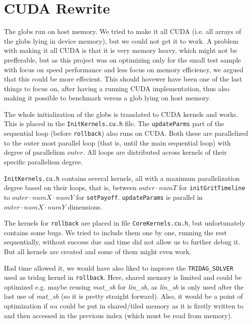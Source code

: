 \section{CUDA Rewrite}
The globs run on host memory. We tried to make it all CUDA (i.e. all arrays of the globs lying in device memory), but we could not get it to work. A problem with making it all CUDA is that it is very memory heavy, which might not be prefferable, but as this project was on optimizing only for the small test sample with focus on speed performance and less focus on memory efficiency, we argued that this could be more effecient. This should hovewer have been one of the last things to focus on, after having a running CUDA implementation, thus also making it possible to benchmark versus a glob lying on host memory.

The whole initialization of the globs is translated to CUDA kernels and works. This is placed in the \texttt{InitKernels.cu.h} file. The \texttt{updateParms} part of the sequential loop (before \texttt{rollback}) also runs on CUDA. Both these are parallelized to the outer most parallel loop (that is, until the main sequential loop) with degree of parallelism $outer$.  All loops are distributed across kernels of their specific parallelism degree.

\texttt{InitKernels.cu.h} contains several kernels, all with a maximum parallelization degree based on their loops, that is, between $outer\cdot numT$ for \texttt{initGritTimeline} to $outer\cdot numX \cdot numY$ for \texttt{setPayoff}. \texttt{updateParams} is parallel in $outer\cdot numX \cdot numY$ dimensions. 

The kernels for \texttt{rollback} are placed in file \texttt{CoreKernels.cu.h}, but unfortunately contains some bugs. We tried to include them one by one, running the rest sequentially, without success due and time did not allow us to further debug it. But all kernels are created and some of them might even work.

Had time allowed it, we would have also liked to improve the \texttt{TRIDAG\_SOLVER} used as tridag kernel in \texttt{rollback}. Here, shared memory is limited and could be optimized e.g. maybe reusing \textit{mat\_sh} for \textit{lin\_sh}, as \textit{lin\_sh} is only used after the last use of \textit{mat\_sh} (so it is pretty straight forward). Also, it would be a point of optimization if $uu$ could be put in shared/tiled memory as it is firstly written to and then accessed in the previous index (which must be read from memory).
